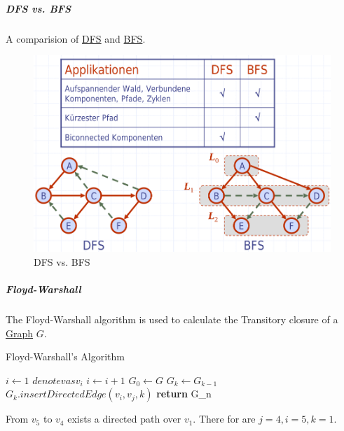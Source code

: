 \documentclass[11pt,twoside,twocolumn,landscape]{article}
\begin{document}
\subparagraph{DFS vs. BFS}
\label{sec:org18ead34}

A comparision of \href{../../../roam/20220202095038-dfs.org}{DFS} and \href{../../../roam/20220202102510-bfs.org}{BFS}.


\begin{figure}[htbp]
\centering
\includegraphics[width=.9\linewidth]{img/dfs_vs_bfs.png}
\caption{\label{fig:org08b9517}DFS vs. BFS}
\end{figure}

\subparagraph{Floyd-Warshall}
\label{sec:org62ed120}

The Floyd-Warshall algorithm is used to calculate the Transitory closure of a \href{../../../roam/20220201163000-graph.org}{Graph} \(G\).


\begin{algorithm}
  \caption{Floyd-Warshall's Algorithm}
  \begin{algorithmic}
    \State $i \gets 1$
    \State $denote v as v_i$
    \State $i \gets i + 1$
    \EndFor
    \State $G_0 \gets G$
    \State $G_k \gets G_{k-1}$
    \State $G_k.insertDirectedEdge(v_i, v_j, k)$
    \EndIf
    \EndIf
    \EndFor
    \EndFor
    \EndFor
    \State \textbf{return} G_n
    \EndProcedure
  \end{algorithmic}
\end{algorithm}



From \(v_5\) to \(v_4\) exists a directed path over \(v_1\).
There for are \(j = 4, i = 5, k = 1\).
\end{document}
